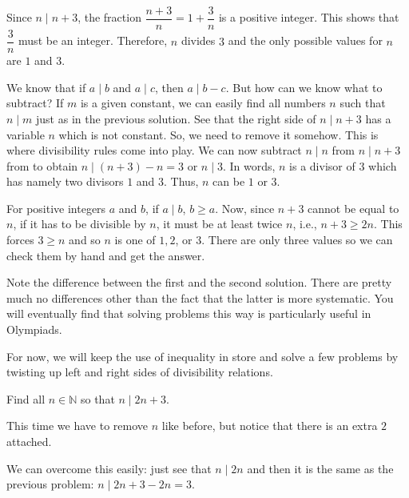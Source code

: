 \documentclass{subfile}
\begin{document}
		\begin{solution}
			Since $n\mid n+3$, the fraction $\dfrac{n+3}{n}=1+\dfrac{3}{n}$ is a positive integer. This shows that $\dfrac{3}{n}$ must be an integer. Therefore, $n$ divides $3$ and the only possible values for $n$ are $1$ and $3$.
		\end{solution}

		\begin{solution}
			We know that if $a\mid b$ and $a\mid c$, then $a\mid b-c$. But how can we know what to subtract? If $m$ is a given constant, we can easily find all numbers $n$ such that $n\mid m$ just as in the previous solution. See that the right side of $n\mid n+3$ has a variable $n$ which is not constant. So, we need to remove it somehow. This is where divisibility rules come into play. We can now subtract $n\mid n$ from $n\mid n+3$ from to obtain $n\mid (n+3)-n=3$ or $n\mid 3$. In words, $n$ is a divisor of $3$ which has namely two divisors $1$ and $3$. Thus, $n$ can be $1$ or $3$.
		\end{solution}

		\begin{solution}
			For positive integers $a$ and $b$, if $a\mid b$, $b\geq a$. Now, since $n+3$ cannot be equal to $n$, if it has to be divisible by $n$, it must be at least twice $n$, i.e., $n+3\geq2n$. This forces $3\geq n$ and so $n$ is one of $1,2$, or $3$. There are only three values so we can check them by hand and get the answer.
		\end{solution}
	Note the difference between the first and the second solution. There are pretty much no differences other than the fact that the latter is more systematic. You will eventually find that solving problems this way is particularly useful in Olympiads.

	For now, we will keep the use of inequality in store and solve a few problems by twisting up left and right sides of divisibility relations.
		\begin{problem}
			Find all $n \in \mathbb{N}$ so that $n\mid 2n+3$.
		\end{problem}

		\begin{solution}
			This time we have to remove $n$ like before, but notice that there is an extra $2$ attached.

			We can overcome this easily: just see that $n\mid 2n$ and then it is the same as the previous problem: $n\mid 2n+3-2n=3$.
		\end{solution}
\end{document}
